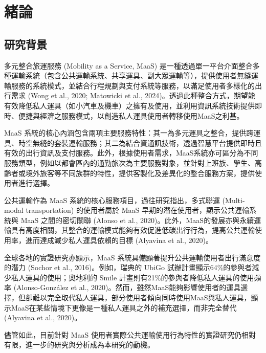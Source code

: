 
\providecommand{\tightlist}{%
  \setlength{\itemsep}{0pt}\setlength{\parskip}{0pt}
}

\chapter{緒論}\label{ux7dd2ux8ad6}

\section{研究背景}\label{ux7814ux7a76ux80ccux666f}

多元整合旅運服務 (Mobility as a Service, MaaS)
是一種透過單一平台介面整合多種運輸系統（包含公共運輸系統、共享運具、副大眾運輸等），提供使用者無縫運輸服務的系統模式，並結合行程規劃與支付系統等服務，以滿足使用者多樣化的出行需求
(Wong et al., 2020; Matowicki et al.,
2024)。透過此種整合方式，期望能有效降低私人運具（如小汽車及機車）之擁有及使用，並利用資訊系統技術提供即時、便捷與經濟之服務模式，以創造私人運具使用者轉移使用MaaS之利基。

MaaS
系統的核心內涵包含兩項主要服務特性：其一為多元運具之整合，提供跨運具、時空無縫的套裝運輸服務；其二為結合資通訊技術，透過智慧平台提供即時且有效的出行資訊及支付服務。此外，根據使用者需求，MaaS系統亦可區分為不同服務類型，例如以都會區內的通勤旅次為主要服務對象，並針對上班族、學生、高齡者或境外旅客等不同族群的特性，提供客製化及差異化的整合服務方案，提供使用者進行選擇。

公共運輸作為 MaaS 系統的核心服務項目，過往研究指出，多式聯運
(Multi-modal transportation) 的使用者屬於 MaaS
早期的潛在使用者，顯示公共運輸系統與 MaaS 之間的密切關聯 (Alonso et al.,
2020)。此外，MaaS的發展亦與永續運輸具有高度相關，其整合的運輸模式能夠有效促進低碳出行行為，提高公共運輸使用率，進而達成減少私人運具依賴的目標
(Alyavina et al., 2020)。

全球各地的實證研究亦顯示，MaaS
系統具備顯著提升公共運輸使用者出行滿意度的潛力 (Sochor et al.,
2016)。例如，瑞典的 UbiGo
試辦計畫顯示64\%的參與者減少私人運具的使用；奧地利的 Smile
計畫則有21\%的參與者降低私人運具的使用頻率 (Alonso-González et al.,
2020)。然而，雖然MaaS能夠影響使用者的運具選擇，但卻難以完全取代私人運具，部分使用者傾向同時使用MaaS與私人運具，顯示MaaS在某些情境下更像是一種私人運具之外的補充選擇，而非完全替代
(Alyavina et al., 2020)。

儘管如此，目前針對 MaaS
使用者實際公共運輸使用行為特性的實證研究仍相對有限，進一步的研究與分析成為本研究的動機。


